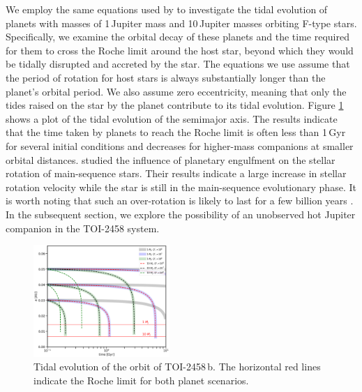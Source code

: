 \documentclass[traditabstract,longauth]{aa}
\begin{document}
We employ the same equations used by \citet{Jackson09} to investigate the tidal evolution of planets with masses of 1\,Jupiter mass and 10\,Jupiter masses orbiting F-type stars. Specifically, we examine the orbital decay of these planets and the time required for them to cross the Roche limit around the host star, beyond which they would be tidally disrupted and accreted by the star. The equations we use assume that the period of rotation for host stars is always substantially longer than the planet's orbital period. We also assume zero eccentricity, meaning that only the tides raised on the star by the planet contribute to its tidal evolution. Figure \ref{fig:tidals} shows a plot of the tidal evolution of the semimajor axis. The results indicate that the time taken by planets to reach the Roche limit is often less than 1\,Gyr for several initial conditions and decreases for higher-mass companions at smaller orbital distances. \citet{Oetjens20,Ahuir21} studied the influence of planetary engulfment on the stellar rotation of main-sequence stars. Their results indicate a large increase in stellar rotation velocity while the star is still in the main-sequence evolutionary phase. It is worth noting that such an over-rotation is likely to last for a few billion years \citep{Ahuir21}. In the subsequent section, we explore the possibility of an unobserved hot Jupiter companion in the TOI-2458 system.

\begin{figure}
\centering
\includegraphics[width=0.46\textwidth, trim= {0.0cm 0.0cm 0.0cm 0.0cm}]{figures/tidals.png}
\caption{Tidal evolution of the orbit of TOI-2458\,b. The horizontal red lines indicate the Roche limit for both planet scenarios.} \label{fig:tidals}
\end{figure}
\end{document}
